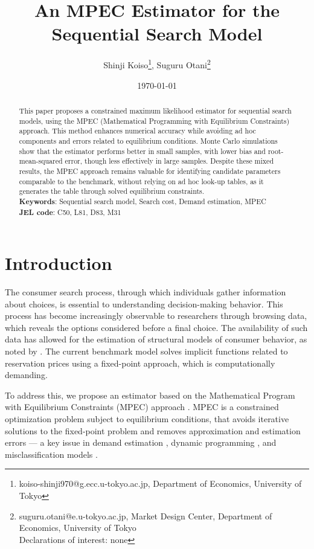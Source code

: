 \documentclass[12pt]{article}
\title{An MPEC Estimator for the Sequential Search Model}
\author{Shinji Koiso\thanks{koiso-shinji970@g.ecc.u-tokyo.ac.jp, Department of Economics, University of Tokyo}, Suguru Otani\thanks{suguru.otani@e.u-tokyo.ac.jp, Market Design Center, Department of Economics, University of Tokyo\\Declarations of interest: none}}
\date{%
\today}
\begin{document}
\maketitle

\begin{abstract}
\noindent
This paper proposes a constrained maximum likelihood estimator for sequential search models, using the MPEC (Mathematical Programming with Equilibrium Constraints) approach. This method enhances numerical accuracy while avoiding ad hoc components and errors related to equilibrium conditions. Monte Carlo simulations show that the estimator performs better in small samples, with lower bias and root-mean-squared error, though less effectively in large samples. Despite these mixed results, the MPEC approach remains valuable for identifying candidate parameters comparable to the benchmark, without relying on ad hoc look-up tables, as it generates the table through solved equilibrium constraints.
\\
\textbf{Keywords}: Sequential search model, Search cost, Demand estimation, MPEC \\
\textbf{JEL code}: C50, L81, D83, M31
\end{abstract}

\section{Introduction}

The consumer search process, through which individuals gather information about choices, is essential to understanding decision-making behavior. This process has become increasingly observable to researchers through browsing data, which reveals the options considered before a final choice. The availability of such data has allowed for the estimation of structural models of consumer behavior, as noted by \cite{ursu2023sequential}. The current benchmark model solves implicit functions related to reservation prices using a fixed-point approach, which is computationally demanding.

To address this, we propose an estimator based on the Mathematical Program with Equilibrium Constraints (MPEC) approach \citep{su2012constrained}. MPEC is a constrained optimization problem subject to equilibrium conditions, that avoids iterative solutions to the fixed-point problem and removes approximation and estimation errors — a key issue in demand estimation \citep{dube2012improving}, dynamic programming \citep{su2012constrained}, and misclassification models \citep{lu2014mpec}. 
\end{document}
